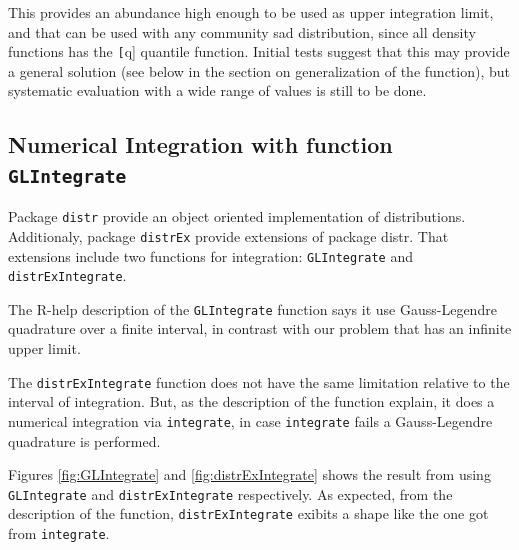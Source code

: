 \documentclass{article}
\newcommand{\code}[1]{\texttt{#1}}
\begin{document}
This provides an abundance high enough to be used as upper integration limit, and that can be used with any community sad distribution, since all density functions has the \code[q] quantile function. Initial tests suggest that this may provide a general solution (see below in the section on generalization of the function), but systematic evaluation with a wide range of values is still to be done.

\subsection*{Numerical Integration with function \code{GLIntegrate}}

Package \code{distr} provide an object oriented implementation of distributions. Additionaly, package \code{distrEx} provide extensions of package distr. That extensions include two functions for integration: \code{GLIntegrate} and \code{distrExIntegrate}.

The R-help description of the \code{GLIntegrate} function says it use Gauss-Legendre quadrature over a finite interval, in contrast with our problem that has an infinite upper limit. 

The \code{distrExIntegrate} function does not have the same limitation relative to the interval of integration. But, as the description of the function explain, it does a numerical integration via \code{integrate}, in case \code{integrate} fails a Gauss-Legendre quadrature is performed.

Figures \ref{fig:GLIntegrate} and \ref{fig:distrExIntegrate} shows the result from using \code{GLIntegrate} and \code{distrExIntegrate} respectively. As expected, from the description of the function, \code{distrExIntegrate} exibits a shape like the one got from \code{integrate}.
\end{document}
